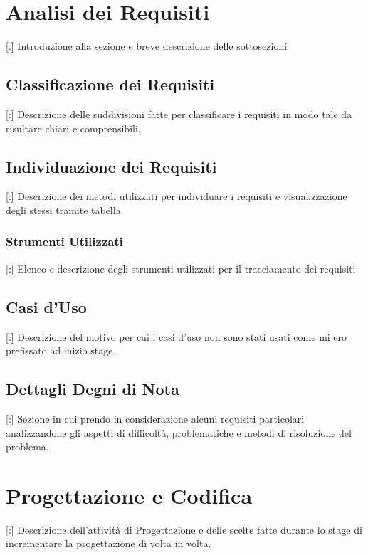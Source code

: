 \section{Analisi dei Requisiti}
[:] Introduzione alla sezione e breve descrizione delle sottosezioni


\subsection{Classificazione dei Requisiti}

[:] Descrizione delle suddivisioni fatte per classificare i requisiti in modo tale da risultare chiari e comprensibili.


\subsection{Individuazione dei Requisiti}

[:] Descrizione dei metodi utilizzati per individuare i requisiti e visualizzazione degli stessi tramite tabella

\subsubsection{Strumenti Utilizzati}

[:] Elenco e descrizione degli strumenti utilizzati per il tracciamento dei requisiti

\subsection{Casi d'Uso}

[:] Descrizione del motivo per cui i casi d'uso non sono stati usati come mi ero prefissato ad inizio stage.

\subsection{Dettagli Degni di Nota}

[:] Sezione in cui prendo in considerazione alcuni requisiti particolari analizzandone gli aspetti di difficoltà, problematiche e metodi di risoluzione del problema.

\section{Progettazione e Codifica}

[:] Descrizione dell'attività di Progettazione e delle scelte fatte durante lo stage di incrementare la progettazione di volta in volta.


